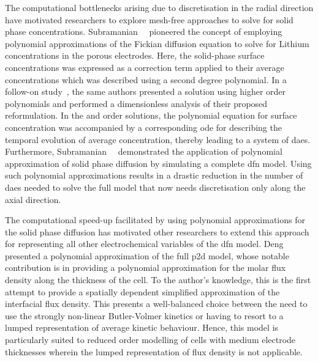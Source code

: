 The  computational  bottlenecks arising  due  to  discretisation in  the  radial
direction  have  motivated  researchers   to  explore  mesh-free  approaches  to
solve for  solid phase  concentrations. Subramanian~\etal~\cite{Subramanian2004}
pioneered  the concept  of employing  polynomial approximations  of the  Fickian
diffusion equation to solve for Lithium concentrations in the porous electrodes.
Here,  the solid-phase  surface  concentrations was  expressed  as a  correction
term  applied  to their  average  concentrations  which  was described  using  a
second degree polynomial. In  a follow-on study~\cite{Subramanian2005}, the same
authors  presented a  solution using  higher order  polynomials and  performed a
dimensionless analysis of their  proposed reformulation. In the 
and    order  solutions,  the polynomial  equation  for  surface
concentration was  accompanied by a  corresponding \gls{ode} for  describing the
temporal  evolution of  average concentration,  thereby leading  to a  system of
\gls{dae}s. Furthermore, Subramanian~\etal{}~\cite{Subramanian2007} demonstrated
the  application  of  polynomial  approximation  of  solid  phase  diffusion  by
simulating  a complete  \gls{dfn}  model. Using  such polynomial  approximations
results in a drastic  reduction in the number of \gls{dae}s  needed to solve the
full model that now needs discretisation only along the axial direction.


The computational  speed-up facilitated  by using polynomial  approximations for
the  solid  phase diffusion  has  motivated  other  researchers to  extend  this
approach for representing  all other electrochemical variables  of the \gls{dfn}
model. Deng~\etal{}~\cite{Deng2018} presented a  polynomial approximation of the
full \gls{p2d}  model, whose notable  contribution is in providing  a polynomial
approximation for  the molar flux  density along the  thickness of the  cell. To
the  author's knowledge,  this  is  the first  attempt  to  provide a  spatially
dependent  simplified  approximation  of  the  interfacial  flux  density.  This
presents a well-balanced choice between the  need to use the strongly non-linear
Butler-Volmer kinetics or having to resort to a lumped representation of average
kinetic behaviour.  Hence, this  model is particularly  suited to  reduced order
modelling  of  cells  with  medium  electrode  thicknesses  wherein  the  lumped
representation of flux density is not applicable.




